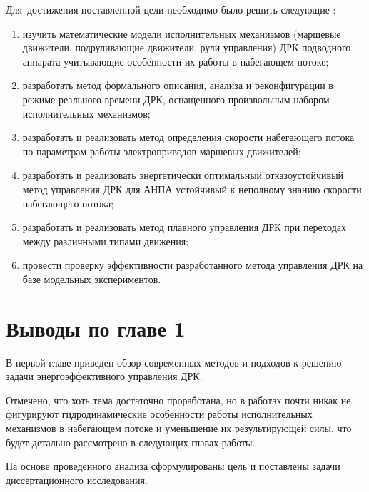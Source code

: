 Для~достижения поставленной цели необходимо было решить следующие {\tasks}:
\begin{enumerate}[beginpenalty=10000] %
  \item изучить математические модели исполнительных механизмов (маршевые движители, подруливающие движители, рули управления) ДРК подводного аппарата учитывающие особенности их работы в набегающем потоке;
  \item разработать метод формального описания, анализа и реконфигурации в режиме реального времени ДРК, оснащенного произвольным набором исполнительных механизмов;
  \item разработать и реализовать метод определения скорости набегающего потока по параметрам работы электроприводов маршевых движителей;
  \item разработать и реализовать энергетически оптимальный отказоустойчивый метод управления ДРК для АНПА устойчивый к неполному знанию скорости набегающего потока;
  \item разработать и реализовать метод плавного управления ДРК при переходах между различными типами движения;
  \item провести проверку эффективности разработанного метода управления ДРК на базе модельных экспериментов.
\end{enumerate}

\section{Выводы по главе 1}\label{sec:Statement/Conclusion}
В первой главе приведен обзор современных методов и подходов к решению задачи энергоэффективного управления ДРК.

Отмечено, что хоть тема достаточно проработана, но в работах почти никак не фигурируют гидродинамические особенности работы исполнительных механизмов в набегающем потоке и уменьшение их результирующей силы, что будет детально рассмотрено в следующих главах работы.

На основе проведенного анализа сформулированы цель и поставлены задачи диссертационного исследования.
